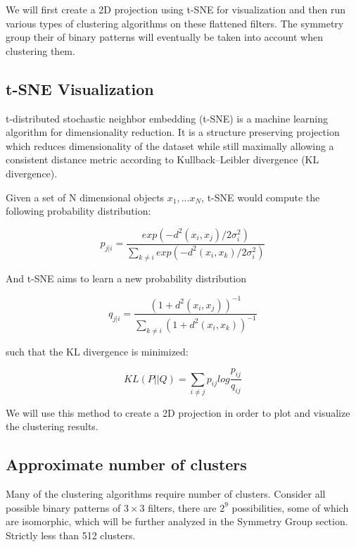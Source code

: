 \documentclass{article} %
\begin{document}
We will first create a 2D projection using t-SNE for visualization and then run various types of clustering algorithms on these flattened filters.
The symmetry group their of binary patterns will eventually be taken into account when clustering them.

\subsection{t-SNE Visualization}

t-distributed stochastic neighbor embedding (t-SNE) is a machine learning algorithm for dimensionality reduction. It is a structure preserving projection which reduces dimensionality of the dataset while still maximally allowing a consistent distance metric according to Kullback–Leibler divergence (KL divergence).

Given a set of N dimensional objects $x_1, ... x_N$, t-SNE would compute the following probability distribution:

\begin{equation}
p_{j|i} = \frac{exp(-d^2(x_i, x_j)/2\sigma_i^2)}{\sum_{k \neq i}exp(-d^2(x_i, x_k)/2\sigma_i^2)}
\end{equation}

And t-SNE aims to learn a new probability distribution

\begin{equation}
q_{j|i} = \frac{(1+d^2(x_i, x_j))^{-1}}{\sum_{k \neq i} (1+d^2(x_i, x_k))^{-1}}
\end{equation}

such that the KL divergence is minimized:

\begin{equation}
KL(P||Q) = \sum_{i \neq j} {p_{ij} log \frac{p_{ij}}{q_{ij}}}
\end{equation}

We will use this method to create a 2D projection in order to plot and visualize the clustering results.

\subsection{Approximate number of clusters}

Many of the clustering algorithms require number of clusters. Consider all possible binary patterns of $3 \times 3$ filters, there are $2^9$ possibilities, some of which are isomorphic, which will be further analyzed in the Symmetry Group section. Strictly less than 512 clusters.
\end{document}
